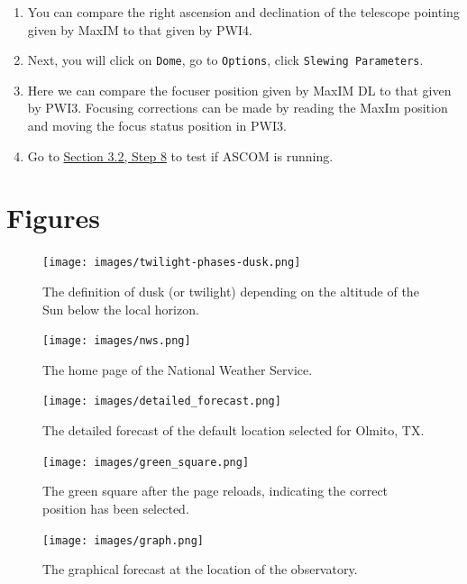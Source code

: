 \documentclass{article}
\begin{document}
\begin{enumerate}
		\item You can compare the right ascension and declination of the telescope pointing given by MaxIM to that given by PWI4. 
		
		\item Next, you will click on \texttt{Dome}, go to \texttt{Options}, click \texttt{Slewing Parameters}.
		
		\item Here we can compare the focuser position given by MaxIM DL to that given by PWI3. Focusing corrections can be made by reading the MaxIm position and moving the focus status position in PWI3.
		
		\item Go to \hyperref[sec:take-test-exposure]{Section 3.2, Step 8} to test if ASCOM is running. 
		
	\end{enumerate}	
	
	\newpage
	\section{Figures}
	\label{sec:figures}
	
	\begin{figure}[htbp!]
		\centering
		\texttt{[image: images/twilight-phases-dusk.png]}
		\caption{The definition of dusk (or twilight) depending on the altitude of the Sun below the local horizon.}
		\label{fig:twilight}
	\end{figure}

	\begin{figure}[htbp!]
		\centering
		\texttt{[image: images/nws.png]}
		\caption{The home page of the National Weather Service.}
		\label{fig:nws}
	\end{figure}

	\begin{figure}[htbp!]
		\centering
		\texttt{[image: images/detailed\_forecast.png]}
		\caption{The detailed forecast of the default location selected for Olmito, TX.}
		\label{fig:forecast}
	\end{figure}

	\begin{figure}[htbp!]
		\centering
		\texttt{[image: images/green\_square.png]}
		\caption{The green square after the page reloads, indicating the correct position has been selected.}
		\label{fig:position}
	\end{figure}

	\begin{figure}[htbp!]
		\centering
		\texttt{[image: images/graph.png]}
		\caption{The graphical forecast at the location of the observatory.}
		\label{fig:graphical}
	\end{figure}
\end{document}
